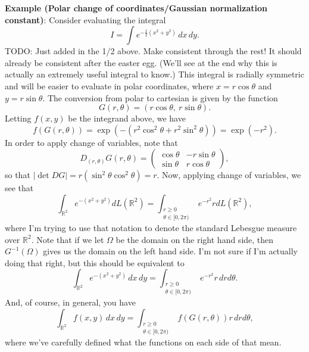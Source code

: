 \documentclass{book}
\newcommand{\dx}{\, dx}
\newcommand{\dy}{\, dy}
\newcommand{\dr}{\, dr}
\newcommand{\R}{\mathbb{R}}
\begin{document}
\vspace{1em}
\noindent
\textbf{Example (Polar change of coordinates/Gaussian normalization constant)}: 
Consider evaluating the integral 
\begin{equation}\label{eq:gauss-soln-step}
I = \int e^{-\frac{1}{2}(x^2 + y^2)} \dx \dy. 
\end{equation}
TODO: Just added in the 1/2 above. Make consistent through the rest! It should already be consistent after the easter egg. 
(We'll see at the end why this is actually an extremely useful integral to know.) This integral is radially symmetric and will be easier to evaluate in polar coordinates, where $x = r\cos\theta$ and $y=r\sin\theta$. 
The conversion from polar to cartesian is given by the function
$$
G(r, \theta) = (r\cos \theta, ~r\sin \theta). 
$$
Letting $f(x,y)$ be the integrand above, we have
$$
f(G(r,\theta)) = \exp( -(r^2\cos^2\theta + r^2 \sin^2 \theta)) = \exp(-r^2).
$$
In order to apply change of variables, note that 
$$
D_{(r,\theta)} G(r,\theta) = 
\begin{pmatrix}
\cos\theta & -r\sin\theta\\
\sin\theta & r\cos\theta
\end{pmatrix},
$$
so that $|\det D G| = r(\sin^2\theta \cos^2\theta) = r$. Now, applying change of variables, we see that
$$
\int_{\R^2} e^{-(x^2 + y^2)} dL(\R^2) = \int_{\substack{r \geq 0\\ \theta \in [0, 2\pi)}} e^{-r^2} r dL(\R^2),
$$
where I'm trying to use that notation to denote the standard Lebesgue measure over $\R^2$. Note that if we let $\Omega$ be the domain on the right hand side, then $G^{-1}(\Omega)$ gives us the domain on the left hand side. I'm not sure if I'm actually doing that right, but this should be equivalent to
$$
\int_{\R^2} e^{-(x^2 + y^2)} \dx \dy = \int_{\substack{r \geq 0\\ \theta \in [0, 2\pi)}} e^{-r^2} r \dr d\theta.
$$
And, of course, in general, you have
$$
\int_{\R^2} f(x,y) \dx \dy = \int_{\substack{r \geq 0\\ \theta \in [0, 2\pi)}} f(G(r,\theta)) r \dr d\theta,
$$
where we've carefully defined what the functions on each side of that mean. 
\end{document}
